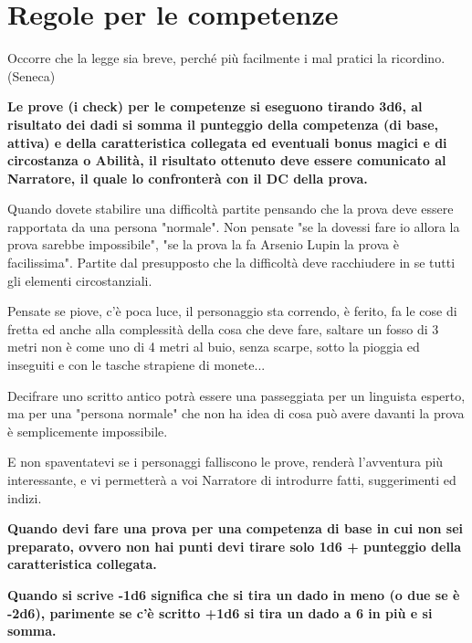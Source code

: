 \documentclass[a4paper,11pt,twoside,openany]{book}
\begin{document}
\pagebreak

\section{Regole per le competenze}

\label{regole-per-le-competenze}
\begin{tcolorbox}[enhanced,arc=5pt,boxrule=0.3pt]{
		Occorre che la legge sia breve, perché più facilmente i mal pratici la ricordino. (Seneca)
	}\end{tcolorbox}\medskip

\textbf{Le prove (i check) per le competenze si eseguono tirando 3d6, al risultato dei dadi si somma il punteggio della competenza (di base, attiva) e della caratteristica collegata ed eventuali bonus magici e di circostanza o Abilità, il risultato ottenuto deve essere comunicato al Narratore, il quale lo confronterà con il DC della prova.}

Quando dovete stabilire una difficoltà partite pensando che la prova deve essere rapportata da una persona "normale". Non pensate "se la dovessi fare io allora la prova sarebbe impossibile", "se la prova la fa Arsenio Lupin la prova è facilissima". Partite dal presupposto che la difficoltà deve racchiudere in se tutti gli elementi circostanziali.

Pensate se piove, c'è poca luce, il personaggio sta correndo, è ferito, fa le cose di fretta ed anche alla complessità della cosa che deve fare, saltare un fosso di 3 metri non è come uno di 4 metri al buio, senza scarpe, sotto la pioggia ed inseguiti e con le tasche strapiene di monete...

Decifrare uno scritto antico potrà essere una passeggiata per un linguista esperto, ma per una "persona normale" che non ha idea di cosa può avere davanti la prova è semplicemente impossibile.

E non spaventatevi se i personaggi falliscono le prove, renderà l'avventura più interessante, e vi permetterà a voi Narratore di introdurre fatti, suggerimenti ed indizi.

\bigskip

\textbf{Quando devi fare una prova per una competenza di base in cui non sei preparato, ovvero non hai punti devi tirare solo 1d6 + punteggio della caratteristica collegata.}

\textbf{Quando si scrive -1d6 significa che si tira un dado in meno (o due se è -2d6), parimente se c'è scritto +1d6 si tira un dado a 6 in più e si somma.}
\end{document}
